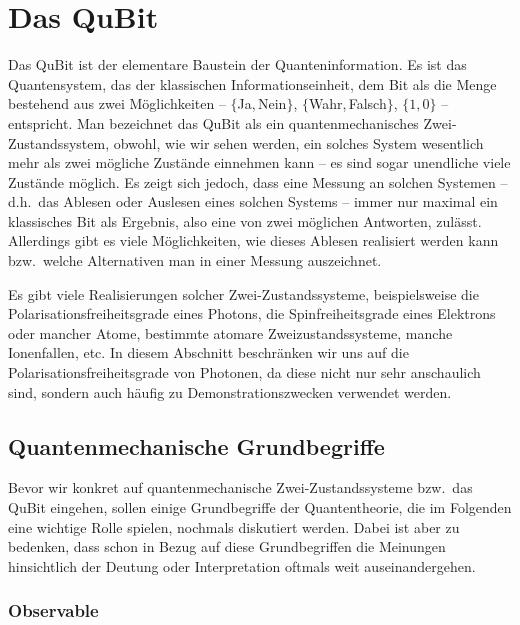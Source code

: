 

\chapter{Das QuBit}
\label{chap_QuBit}

%
Das QuBit 
ist der elementare Baustein der Quanteninformation. Es ist das Quantensystem, das der
klassischen Informationseinheit, dem Bit als die Menge bestehend aus zwei M\"oglichkeiten -- 
$\{$Ja,\,Nein$\}$, $\{$Wahr,\,Falsch$\}$, $\{1,0\}$ -- entspricht. Man bezeichnet das QuBit
als ein quantenmechanisches Zwei-Zustandssystem, 
obwohl, wie wir sehen werden, ein solches
System wesentlich mehr als zwei m\"ogliche Zust\"ande einnehmen kann -- 
es sind sogar unendliche viele Zust\"ande
m\"oglich. Es zeigt sich jedoch, dass eine Messung an solchen Systemen -- d.h.\ das Ablesen oder
Auslesen eines solchen Systems -- immer nur maximal
ein klassisches Bit als Ergebnis, also eine von zwei m\"oglichen Antworten, zul\"asst. Allerdings
gibt es viele M\"oglichkeiten, wie dieses Ablesen realisiert werden kann bzw.\ welche
Alternativen man in einer Messung auszeichnet. 

Es gibt viele Realisierungen solcher Zwei-Zustandssysteme, beispielsweise die Polarisationsfreiheitsgrade
eines Photons, die Spinfreiheitsgrade eines Elektrons oder mancher Atome, bestimmte atomare Zweizustandssysteme, 
manche Ionenfallen, etc. In diesem Abschnitt beschr\"anken wir uns auf die Polarisationsfreiheitsgrade von Photonen,
da diese nicht nur sehr anschaulich sind, sondern auch h\"aufig zu Demonstrationszwecken verwendet werden.

\section{Quantenmechanische Grundbegriffe}

Bevor wir konkret auf quantenmechanische Zwei-Zustandssysteme bzw.\ das
QuBit eingehen, sollen einige Grundbegriffe der Quantentheorie, die im Folgenden 
eine wichtige Rolle spielen, nochmals diskutiert werden. Dabei ist aber zu bedenken, dass schon in
Bezug auf diese Grundbegriffen die Meinungen hinsichtlich der Deutung oder Interpretation
oftmals weit auseinandergehen. 

\subsection{Observable}

